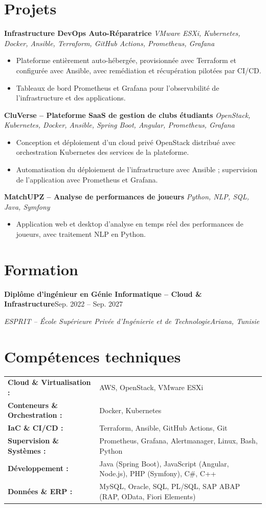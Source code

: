 \documentclass[10pt,a4paper]{article}
\newcommand{\entry}[4]{%
  \textbf{#1}\hfill #2\par
  \textit{#3}\hfill \textit{#4}\par}
\newcommand{\project}[2]{\textbf{#1} \textbar{} \textit{#2}\par}
\newcommand{\skill}[2]{\textbf{#1 :} & #2 \\}
\begin{document}
\section{Projets}
\project{Infrastructure DevOps Auto-Réparatrice}{VMware ESXi, Kubernetes, Docker, Ansible, Terraform, GitHub Actions, Prometheus, Grafana}
\begin{itemize}
  \item Plateforme entièrement auto-hébergée, provisionnée avec Terraform et configurée avec Ansible, avec remédiation et récupération pilotées par CI/CD.
  \item Tableaux de bord Prometheus et Grafana pour l'observabilité de l'infrastructure et des applications.
\end{itemize}
\vspace{2pt}
\project{CluVerse -- Plateforme SaaS de gestion de clubs étudiants}{OpenStack, Kubernetes, Docker, Ansible, Spring Boot, Angular, Prometheus, Grafana}
\begin{itemize}
  \item Conception et déploiement d'un cloud privé OpenStack distribué avec orchestration Kubernetes des services de la plateforme.
  \item Automatisation du déploiement de l'infrastructure avec Ansible ; supervision de l'application avec Prometheus et Grafana.
\end{itemize}
\vspace{2pt}
\project{MatchUPZ -- Analyse de performances de joueurs}{Python, NLP, SQL, Java, Symfony}
\begin{itemize}
  \item Application web et desktop d'analyse en temps réel des performances de joueurs, avec traitement NLP en Python.
\end{itemize}

\section{Formation}
\entry{Diplôme d'ingénieur en Génie Informatique -- Cloud \& Infrastructure}{Sep. 2022 -- Sep. 2027}{ESPRIT -- École Supérieure Privée d'Ingénierie et de Technologie}{Ariana, Tunisie}

\section{Compétences techniques}
\begin{tabular}{@{}p{5.2cm}l@{}}
  \skill{Cloud \& Virtualisation}{AWS, OpenStack, VMware ESXi}
  \skill{Conteneurs \& Orchestration}{Docker, Kubernetes}
  \skill{IaC \& CI/CD}{Terraform, Ansible, GitHub Actions, Git}
  \skill{Supervision \& Systèmes}{Prometheus, Grafana, Alertmanager, Linux, Bash, Python}
  \skill{Développement}{Java (Spring Boot), JavaScript (Angular, Node.js), PHP (Symfony), C\#, C++}
  \skill{Données \& ERP}{MySQL, Oracle, SQL, PL/SQL, SAP ABAP (RAP, OData, Fiori Elements)}
\end{tabular}
\end{document}
